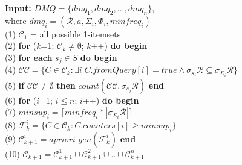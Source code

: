 \begin{figure}[h]
	\noindent
	\hspace*{6em}\textbf{Input:} $ DMQ = \{dmq_1, dmq_2, ..., dmq_n\} $, \\
	\noindent
	\hspace*{6em}where $ dmq_i = (\mathcal{R}, a, \Sigma_i, \Phi_i, minfreq_i) $ \\
	\hspace*{6em} (1) \hspace{1em} $\mathcal{C}_1$ = {all possible 1-itemsets} \\
	\hspace*{6em} (2) \hspace{1em} \textbf{for} ($k$=1; $\mathcal{C}_k \neq \emptyset$; $k$++) \textbf{do begin} \\
	\hspace*{6em} (3) \hspace{2em}   \textbf{for each} $s_j \in S$ \textbf{do begin} \\
	\hspace*{6em} (4) \hspace{3em}       $\mathcal{C}\mathcal{C}= \{C \in \mathcal{C}_k : \exists i \; C.fromQuery[i] = true \wedge \sigma_{s_j}\mathcal{R}
	\subseteq \sigma_{\Sigma_i}\mathcal{R}\}$ \\
	\hspace*{6em} (5) \hspace{3em}       \textbf{if} $\mathcal{C}\mathcal{C} \neq \emptyset $
	\textbf{then} $ count(\mathcal{C}\mathcal{C}, \sigma_{s_j}\mathcal{R}) $ \textbf{end} \\
	\hspace*{6em} (6) \hspace{2em}    \textbf{for} ($i$=1; $i \leq n$; $i$++) \textbf{do begin} \\
	\hspace*{6em} (7) \hspace{3em}      $minsup_i = \lceil minfreq_i * |\sigma_{\Sigma_i}\mathcal{R}| \rceil$  \\
	\hspace*{6em} (8) \hspace{3em}      $\mathcal{F}_k^i = \{C \in \mathcal{C}_k : C.counters[i] \geq minsup_i\} $ 	 \\
	\hspace*{6em} (9) \hspace{3em}      $\mathcal{C}_{k+1}^i = apriori\_gen(\mathcal{F}_k^i)$ \textbf{end} \\
	\hspace*{6em} (10)\hspace{2em}    $\mathcal{C}_{k+1} = \mathcal{C}_{k+1}^1 \cup \mathcal{C}_{k+1}^2 \cup..\cup \mathcal{C}_{k+1}^n $ \\

\end{figure}
